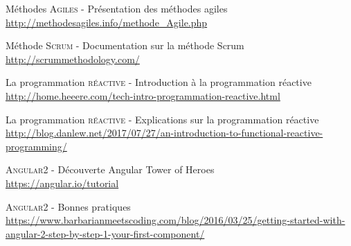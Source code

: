 \documentclass[11pt,twoside]{scrreprt}
\begin{document}
\begin{thebibliography}{9}
		Méthodes \textsc{Agiles - }\textsf{Présentation des méthodes agiles} \\
		\url{http://methodesagiles.info/methode_Agile.php}
		
		Méthode \textsc{Scrum - }\textsf{Documentation sur la méthode Scrum} \\
		\url{http://scrummethodology.com/}
		
		La programmation \textsc{réactive - }\textsf{Introduction à la programmation réactive} \\
		\url{http://home.heeere.com/tech-intro-programmation-reactive.html}
		
		La programmation \textsc{réactive - }\textsf{Explications sur la programmation réactive} \\
		\url{http://blog.danlew.net/2017/07/27/an-introduction-to-functional-reactive-programming/}
		
		\textsc{Angular2 - }\textsf{Découverte Angular Tower of Heroes} \\
		\url{https://angular.io/tutorial}
		
		\textsc{Angular2 - }\textsf{Bonnes pratiques} \\
		\url{https://www.barbarianmeetscoding.com/blog/2016/03/25/getting-started-with-angular-2-step-by-step-1-your-first-component/}
		
\end{thebibliography}

\end{document}
